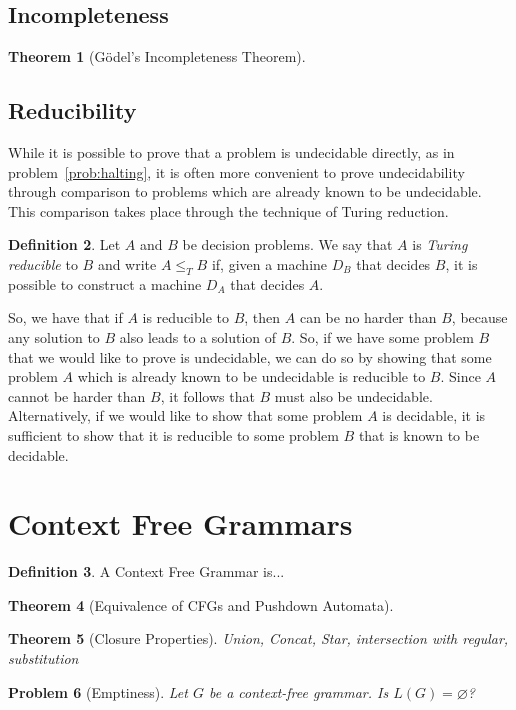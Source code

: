 \documentclass[psamsfonts]{amsart}
\newtheorem{thm}{Theorem}[section]
\newtheorem{prob}[thm]{Problem}
\theoremstyle{definition}
\newtheorem{defn}[thm]{Definition}
\theoremstyle{remark}
\numberwithin{equation}{section}
\begin{document}
\subsection{Incompleteness}
\begin{thm}[G\"odel's Incompleteness Theorem] 
  \cite{kleene43_recur_predic_quant}
\end{thm}
\subsection{Reducibility}
\label{subsec:reducibility}
While it is possible to prove that a problem is undecidable directly, as in
problem~\ref{prob:halting}, it is often more convenient to prove undecidability
through comparison to problems which are already known to be undecidable. This
comparison takes place through the technique of Turing reduction.
\begin{defn}
  Let $A$ and $B$ be decision problems. We say that $A$ is \emph{Turing reducible}
  to $B$ and write $A \leq_T B$ if, given a machine $D_B$ that decides $B$, it is possible to construct
  a machine $D_A$ that decides $A$.
\end{defn}
So, we have that if $A$ is reducible to $B$, then $A$ can be no harder than $B$,
because any solution to $B$ also leads to a solution of $B$. So, if we have some
problem $B$ that we would like to prove is undecidable, we can do so by showing
that some problem $A$ which is already known to be undecidable is reducible to
$B$. Since $A$ cannot be harder than $B$, it follows that $B$ must also be
undecidable. Alternatively, if we would like to show that some problem $A$ is
decidable, it is sufficient to show that it is reducible to some problem $B$
that is known to be decidable.
\cite{sipser13:_introd_theor_comput}
\cite{post44:_recur}

\cite{kleene80_introd}

\section{Context Free Grammars}

\begin{defn}
 A Context Free Grammar is...
\end{defn}


\begin{thm}[Equivalence of CFGs and Pushdown Automata]
  \cite{hopcroft07:_introd_autom_theor_languag_comput}
\end{thm}
\begin{thm}[Closure Properties]
  \cite{sipser13:_introd_theor_comput}
  Union, Concat, Star, intersection with regular, substitution
\end{thm}
\begin{prob}[Emptiness]
  \label{prob:cfg:emptiness}
Let $G$ be a context-free grammar. Is $L(G)=\varnothing$?
\end{prob}
\end{document}
